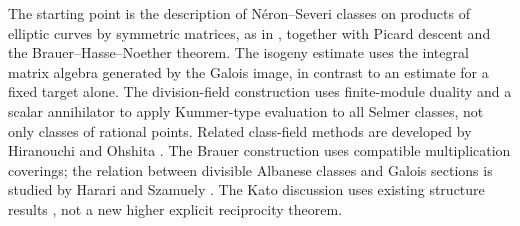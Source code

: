 \documentclass[11pt,a4paper]{article}
\theoremstyle{definition}\newtheorem{definition}[theorem]{Definition}
\theoremstyle{remark}\newtheorem{remark}[theorem]{Remark}
\numberwithin{equation}{section}
\begin{document}
The starting point is the description of N\'{e}ron--Severi classes on products of elliptic curves by symmetric matrices, as in \cite{RS}, together with Picard descent and the Brauer--Hasse--Noether theorem. The isogeny estimate uses the integral matrix algebra generated by the Galois image, in contrast to an estimate for a fixed target alone. The division-field construction uses finite-module duality and a scalar annihilator to apply Kummer-type evaluation to all Selmer classes, not only classes of rational points. Related class-field methods are developed by Hiranouchi and Ohshita \cite{HO}. The Brauer construction uses compatible multiplication coverings; the relation between divisible Albanese classes and Galois sections is studied by Harari and Szamuely \cite{HS}. The Kato discussion uses existing structure results \cite{BCGS,Kim}, not a new higher explicit reciprocity theorem.
\end{document}
